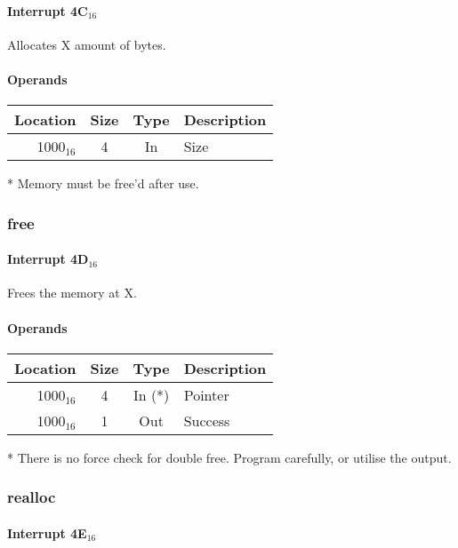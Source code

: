 \documentclass{article}
\begin{document}
\paragraph{Interrupt 4C$_{16}$}

Allocates X amount of bytes.

\paragraph{Operands}

\begin{tabular}{|r|c|c|l|}
	\hline
	\textbf{Location} & \textbf{Size} & \textbf{Type} & \textbf{Description} \\
	\hline
	1000$_{16}$ & 4 & In & Size \\
	\hline
\end{tabular}

* Memory must be free'd after use.

\subsubsection{free}

\paragraph{Interrupt 4D$_{16}$}

Frees the memory at X.

\paragraph{Operands}

\begin{tabular}{|r|c|c|l|}
	\hline
	\textbf{Location} & \textbf{Size} & \textbf{Type} & \textbf{Description} \\
	\hline
	1000$_{16}$ & 4 & In (*) & Pointer \\
	\hline
	1000$_{16}$ & 1 & Out & Success \\
	\hline
\end{tabular}

* There is no force check for double free. Program carefully, or utilise the output.

\subsubsection{realloc}

\paragraph{Interrupt 4E$_{16}$}
\end{document}
